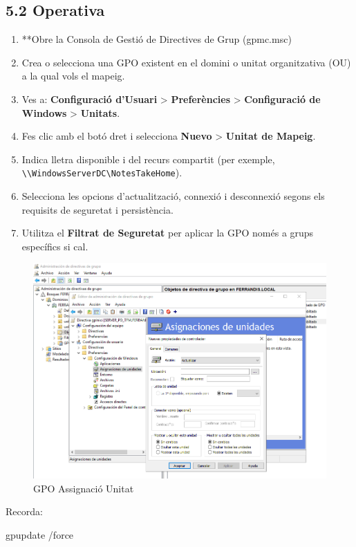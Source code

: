 \documentclass[
  a4paper,
]{article}
\newenvironment{Shaded}{\begin{snugshade}}{\end{snugshade}}
\newcommand{\AttributeTok}[1]{\textcolor[rgb]{0.13,0.29,0.53}{#1}}
\newcommand{\NormalTok}[1]{#1}
\providecommand{\tightlist}{%
  \setlength{\itemsep}{0pt}\setlength{\parskip}{0pt}}
\begin{document}
\subsection{5.2 Operativa}\label{operativa-1}

\begin{enumerate}
\def\labelenumi{\arabic{enumi}.}
\tightlist
\item
  **Obre la Consola de Gestió de Directives de Grup (gpmc.msc)
\item
  Crea o selecciona una GPO existent en el domini o unitat organitzativa
  (OU) a la qual vols el mapeig.
\item
  Ves a: \textbf{Configuració d'Usuari} \textgreater{}
  \textbf{Preferències} \textgreater{} \textbf{Configuració de Windows}
  \textgreater{} \textbf{Unitats}.
\item
  Fes clic amb el botó dret i selecciona \textbf{Nuevo} \textgreater{}
  \textbf{Unitat de Mapeig}.
\item
  Indica lletra disponible i del recurs compartit (per exemple,
  \texttt{\textbackslash{}\textbackslash{}WindowsServerDC\textbackslash{}NotesTakeHome}).
\item
  Selecciona les opcions d'actualització, connexió i desconnexió segons
  els requisits de seguretat i persistència.
\item
  Utilitza el \textbf{Filtrat de Seguretat} per aplicar la GPO només a
  grups específics si cal.
\end{enumerate}

\begin{figure}
\centering
\includegraphics{png/CapturaGPO.png}
\caption{GPO Assignació Unitat}
\end{figure}

Recorda:

\begin{Shaded}
\begin{Highlighting}[]
\NormalTok{gpupdate }\AttributeTok{/force}
\end{Highlighting}
\end{Shaded}
\end{document}
